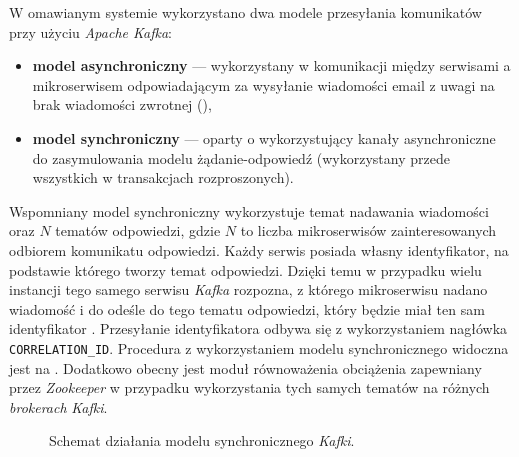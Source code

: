 W omawianym systemie wykorzystano dwa modele przesyłania komunikatów przy użyciu \textit{Apache Kafka}:
%
\begin{itemize}
  \item \textbf{model asynchroniczny} — wykorzystany w komunikacji między serwisami a mikroserwisem odpowiadającym za
        wysyłanie wiadomości email z uwagi na brak wiadomości zwrotnej (),
  \item \textbf{model synchroniczny} — oparty o  wykorzystujący
        kanały asynchroniczne do zasymulowania modelu żądanie-odpowiedź (wykorzystany przede wszystkich w transakcjach
        rozproszonych).
\end{itemize}

Wspomniany model synchroniczny wykorzystuje temat nadawania wiadomości oraz $N$ tematów odpowiedzi, gdzie $N$ to liczba
mikroserwisów zainteresowanych odbiorem komunikatu odpowiedzi. Każdy serwis posiada własny identyfikator, na podstawie
którego tworzy temat odpowiedzi. Dzięki temu w przypadku wielu instancji tego samego serwisu \textit{Kafka} rozpozna, z
którego mikroserwisu nadano wiadomość i do odeśle do tego tematu odpowiedzi, który będzie miał ten sam identyfikator
\cite{bib:kafka-req-reply}. Przesyłanie identyfikatora odbywa się z wykorzystaniem nagłówka \verb|CORRELATION_ID|.
Procedura z wykorzystaniem modelu synchronicznego widoczna jest na . Dodatkowo obecny jest moduł
równoważenia obciążenia zapewniany przez \textit{Zookeeper} w przypadku wykorzystania tych samych tematów na różnych
\textit{brokerach} \textit{Kafki}.
%
\begin{figure}[H]
  \centering
  \caption{Schemat działania modelu synchronicznego \textit{Kafki}.}
  \label{fig:kafka-sync}
\end{figure}


